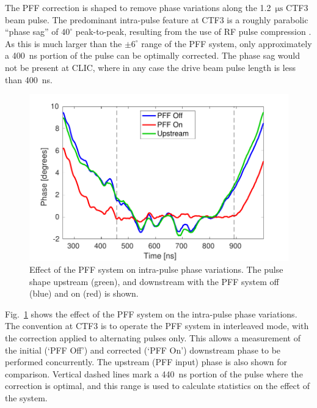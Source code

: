 \documentclass[%
 reprint,
 superscriptaddress,
 amsmath,
 amssymb,
 prl,
]{revtex4-1}
\begin{document}
The PFF correction is shaped to remove phase variations along the 
1.2~\(\mathrm{\mu s}\) CTF3 beam pulse. The predominant intra-pulse feature at 
CTF3 is a roughly parabolic ``phase sag'' of \(40^\circ\) peak-to-peak, 
resulting from the use of RF pulse compression \cite{CLICCDR}. As this is much 
larger than the \(\pm 6^\circ\) range of the PFF system, only approximately a 
400~ns portion of the pulse can be optimally corrected. The phase sag would not 
be present at CLIC, where in any case the drive beam pulse length is less than 
400~ns.

\begin{figure}
	\includegraphics[width=\columnwidth]{figs/shape}
	\caption{\label{fig:shape}Effect of the PFF system on intra-pulse phase 
		variations. The pulse shape upstream (green), and downstream with the 
		PFF 
		system off (blue) and on (red) is shown.}
\end{figure}

Fig.~\ref{fig:shape} shows the effect of the PFF system on the intra-pulse 
phase variations. The convention at CTF3 is to 
operate the PFF system in interleaved mode, with 
the correction applied to alternating pulses only. This allows a measurement of 
the initial (`PFF Off') and corrected (`PFF On') downstream phase to be 
performed concurrently. The upstream (PFF input) phase is also shown for 
comparison. Vertical dashed lines mark a 440~ns portion of the pulse where the 
correction is optimal, and this range is used to calculate statistics on the 
effect of the system. 
\end{document}
